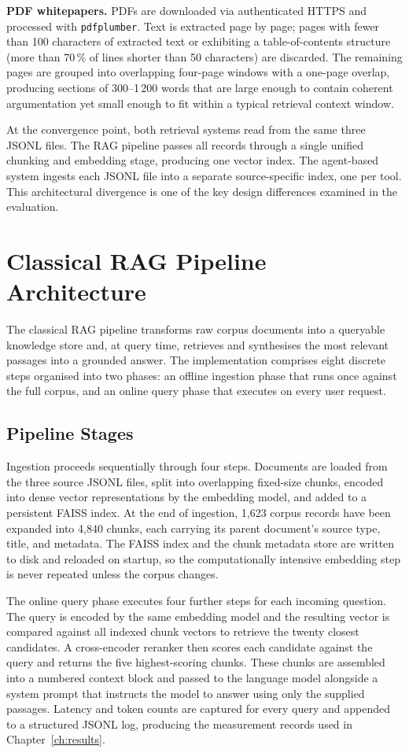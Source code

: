 \textbf{PDF whitepapers.} PDFs are downloaded via authenticated HTTPS and processed with \texttt{pdfplumber}. Text is extracted page by page; pages with fewer than 100 characters of extracted text or exhibiting a table-of-contents structure (more than 70\,\% of lines shorter than 50 characters) are discarded. The remaining pages are grouped into overlapping four-page windows with a one-page overlap, producing sections of 300–1\,200 words that are large enough to contain coherent argumentation yet small enough to fit within a typical retrieval context window.

At the convergence point, both retrieval systems read from the same three JSONL files. The RAG pipeline passes all records through a single unified chunking and embedding stage, producing one vector index. The agent-based system ingests each JSONL file into a separate source-specific index, one per tool. This architectural divergence is one of the key design differences examined in the evaluation.

\section{Classical RAG Pipeline Architecture}

The classical RAG pipeline transforms raw corpus documents into a queryable knowledge store and, at query time, retrieves and synthesises the most relevant passages into a grounded answer. The implementation comprises eight discrete steps organised into two phases: an offline ingestion phase that runs once against the full corpus, and an online query phase that executes on every user request.

\subsection{Pipeline Stages}

Ingestion proceeds sequentially through four steps. Documents are loaded from the three source JSONL files, split into overlapping fixed-size chunks, encoded into dense vector representations by the embedding model, and added to a persistent FAISS index. At the end of ingestion, 1,623 corpus records have been expanded into 4,840 chunks, each carrying its parent document's source type, title, and metadata. The FAISS index and the chunk metadata store are written to disk and reloaded on startup, so the computationally intensive embedding step is never repeated unless the corpus changes.

The online query phase executes four further steps for each incoming question. The query is encoded by the same embedding model and the resulting vector is compared against all indexed chunk vectors to retrieve the twenty closest candidates. A cross-encoder reranker then scores each candidate against the query and returns the five highest-scoring chunks. These chunks are assembled into a numbered context block and passed to the language model alongside a system prompt that instructs the model to answer using only the supplied passages. Latency and token counts are captured for every query and appended to a structured JSONL log, producing the measurement records used in Chapter~\ref{ch:results}.

